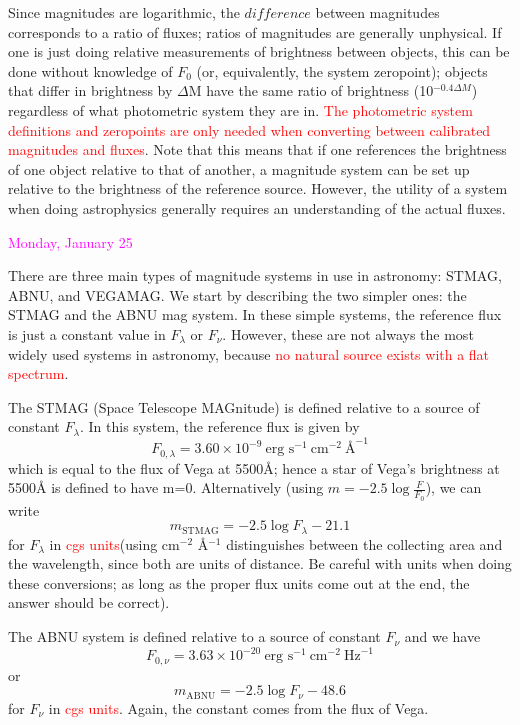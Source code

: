 \documentclass[12pt]{article}
\begin{document}
Since magnitudes are logarithmic, the $difference$ between
magnitudes corresponds to a ratio of fluxes; ratios of magnitudes are
generally unphysical. If one is just doing relative measurements of
brightness between objects, this can be done without knowledge of $F_0$
(or, equivalently, the system zeropoint); objects that differ in brightness
by $\Delta$M have the same ratio of brightness (10$^{-0.4 \Delta M}$)
regardless of what photometric system they are in.
\textcolor{red}{The photometric system
definitions and zeropoints are only needed when converting between calibrated
magnitudes and fluxes}. Note that this means that if one references the
brightness of one object relative to that of another, a magnitude system
can be set up relative to the brightness of the reference source. However, the
utility of a system when doing astrophysics generally requires an
understanding of the actual fluxes.

\textcolor{magenta}{Monday, January 25}

There are three main types of magnitude systems in use in astronomy:
STMAG, ABNU, and VEGAMAG.
We start by describing the two simpler ones: the STMAG and the ABNU mag system.
In these simple systems, the reference flux is just a constant value in
$F_{\lambda}$ or $F_{\nu}$. However, these are not always the most widely used
systems in astronomy, because
\textcolor{red}{no natural source exists with a flat spectrum}.

The STMAG (Space Telescope MAGnitude) is defined
relative to a source of constant $F_{\lambda}$. In this system,
the reference flux is given by
\begin{equation*}
    F_{0,\lambda} = 3.60 \times 10^{-9}\ \textrm{erg\ s}^{-1}\
    \textrm{cm}^{-2}\ \textrm{\AA{}}^{-1}
\end{equation*}
which is equal to the flux of Vega at 5500\AA{};
hence a star of Vega's brightness at 5500\AA{} is defined to have m=0.
Alternatively (using $m = -2.5\log \frac{F}{F_0}$), we can write
\begin{equation*}
    m_{\textrm{STMAG}} = -2.5 \log F_{\lambda} - 21.1
\end{equation*}
for $F_{\lambda}$ in \textcolor{red}{cgs units}(using cm$^{-2}$ \AA{}$^{-1}$
distinguishes between the collecting area and the wavelength, since both are
units of distance. Be careful with units when doing these conversions; as
long as the proper flux units come out at the end, the answer should be
correct).

The ABNU system is defined relative to a source
of constant $F_{\nu}$ and we have
\begin{equation*}
    F_{0,\nu} = 3.63 \times 10^{-20}\ \textrm{erg\ s}^{-1}\
    \textrm{cm}^{-2}\ \textrm{Hz}^{-1}
\end{equation*}
or
\begin{equation*}
    m_{\textrm{ABNU}} = -2.5 \log F_{\nu} - 48.6
\end{equation*}
for $F_{\nu}$ in \textcolor{red}{cgs units}.
Again, the constant comes from the flux of Vega.
\end{document}

